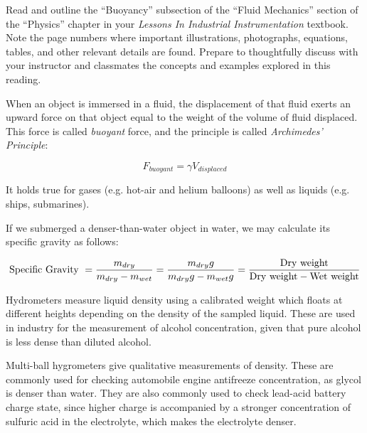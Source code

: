 

Read and outline the ``Buoyancy'' subsection of the ``Fluid Mechanics'' section of the ``Physics'' chapter in your {\it Lessons In Industrial Instrumentation} textbook.  Note the page numbers where important illustrations, photographs, equations, tables, and other relevant details are found.  Prepare to thoughtfully discuss with your instructor and classmates the concepts and examples explored in this reading.














When an object is immersed in a fluid, the displacement of that fluid exerts an upward force on that object equal to the weight of the volume of fluid displaced.  This force is called {\it buoyant} force, and the principle is called {\it Archimedes' Principle}:

$$F_{buoyant} = \gamma V_{displaced}$$

It holds true for gases (e.g. hot-air and helium balloons) as well as liquids (e.g. ships, submarines).

\vskip 10pt

If we submerged a denser-than-water object in water, we may calculate its specific gravity as follows:

$$\hbox{Specific Gravity } = {m_{dry} \over {m_{dry} - m_{wet}}} = {m_{dry}g \over {m_{dry}g - m_{wet}g}} = {\hbox{Dry weight} \over \hbox{Dry weight} - \hbox{Wet weight}}$$

Hydrometers measure liquid density using a calibrated weight which floats at different heights depending on the density of the sampled liquid.  These are used in industry for the measurement of alcohol concentration, given that pure alcohol is less dense than diluted alcohol.

Multi-ball hygrometers give qualitative measurements of density.  These are commonly used for checking automobile engine antifreeze concentration, as glycol is denser than water.  They are also commonly used to check lead-acid battery charge state, since higher charge is accompanied by a stronger concentration of sulfuric acid in the electrolyte, which makes the electrolyte denser.

